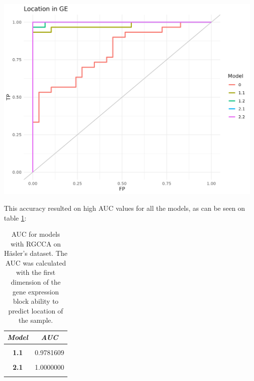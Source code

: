 \documentclass[
  12pt,
  a4paper,
  twoside,
  openright]{book}
\let\origfigure\figure
\let\endorigfigure\endfigure
\renewenvironment{figure}[1][2] {
    \expandafter\origfigure\expandafter[!htp]
} {
    \endorigfigure
}
\begin{document}
\begin{figure}
\includegraphics[width=1\linewidth]{images/hasler-auc} \caption[AUC for models with RGCCA on the Häsler's dataset]{AUC for models with RGCCA on the Häsler's dataset. The AUC was calculated with the first dimension of the gene expression block ability to predict location of the sample.}\label{fig:hasler-auc-plot}
\end{figure}

This accuracy resulted on high AUC values for all the models, as can be seen on table \ref{tab:hasler-auc}:

\begin{table}[H]

\caption[AUC for models with RGCCA on Häsler's dataset]{\label{tab:hasler-auc}AUC for models with RGCCA on Häsler's dataset. The AUC was calculated with the first dimension of the gene expression block ability to predict location of the sample.}
\centering
\begin{tabular}[t]{|>{}c|>{}c|}
\hline
\em{\textbf{Model}} & \em{\textbf{AUC}}\\
\hline
\textbf{\cellcolor{gray!6}{0}} & \cellcolor{gray!6}{0.8011494}\\
\hline
\textbf{1.1} & 0.9781609\\
\hline
\textbf{\cellcolor{gray!6}{1.2}} & \cellcolor{gray!6}{0.9977011}\\
\hline
\textbf{2.1} & 1.0000000\\
\hline
\textbf{\cellcolor{gray!6}{2.2}} & \cellcolor{gray!6}{1.0000000}\\
\hline
\end{tabular}
\end{table}
\end{document}
